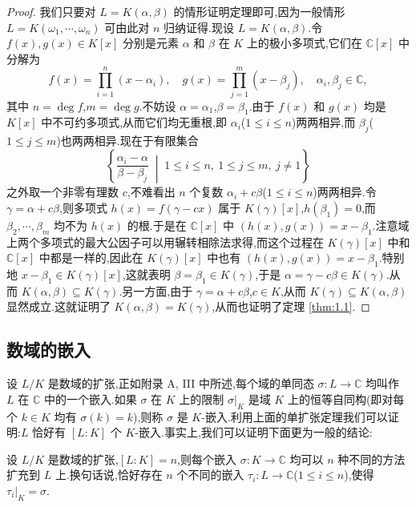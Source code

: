 \begin{proof}
我们只要对 $L=K(\alpha,\beta)$ 的情形证明定理即可,因为一般情形 $L=K(\omega_1,\cdots,\omega_n)$ 可由此对 $n$ 归纳证得.现设 $L=K(\alpha,\beta)$.令 $f(x),g(x)\in K[x]$ 分别是元素 $\alpha$ 和 $\beta$ 在 $K$ 上的极小多项式,它们在 $\mathbb{C}[x]$ 中分解为
\[
  f(x)=\prod_{i=1}^{n}(x-\alpha_i),\quad
  g(x)=\prod_{j=1}^{m}(x-\beta_j),\quad \alpha_i,\beta_j\in\mathbb{C},
\]
其中 $n=\deg f$,$m=\deg g$.不妨设 $\alpha=\alpha_1$,$\beta=\beta_1$.由于 $f(x)$ 和 $g(x)$ 均是 $K[x]$ 中不可约多项式,从而它们均无重根,即 $\alpha_i$($1\leqslant i\leqslant n$)两两相异,而 $\beta_j$($1\leqslant j\leqslant m$)也两两相异.现在于有限集合
\[
  \left\{\frac{\alpha_i-\alpha}{\beta-\beta_j}\;\middle|\;1\leqslant i\leqslant n,\ 1\leqslant j\leqslant m,\ j\neq 1\right\}
\]
之外取一个非零有理数 $c$,不难看出 $n$ 个复数 $\alpha_i+c\beta$($1\leqslant i\leqslant n$)两两相异.令 $\gamma=\alpha+c\beta$,则多项式 $h(x)=f(\gamma-cx)$ 属于 $K(\gamma)[x]$,$h(\beta_1)=0$,而 $\beta_2,\cdots,\beta_m$ 均不为 $h(x)$ 的根.于是在 $\mathbb{C}[x]$ 中 $(h(x),g(x))=x-\beta_1$.注意域上两个多项式的最大公因子可以用辗转相除法求得,而这个过程在 $K(\gamma)[x]$ 中和 $\mathbb{C}[x]$ 中都是一样的,因此在 $K(\gamma)[x]$ 中也有 $(h(x),g(x))=x-\beta_1$.特别地 $x-\beta_1\in K(\gamma)[x]$,这就表明 $\beta=\beta_1\in K(\gamma)$,于是 $\alpha=\gamma-c\beta\in K(\gamma)$.从而 $K(\alpha,\beta)\subseteq K(\gamma)$.另一方面,由于 $\gamma=\alpha+c\beta$,$c\in K$,从而 $K(\gamma)\subseteq K(\alpha,\beta)$ 显然成立.这就证明了 $K(\alpha,\beta)=K(\gamma)$,从而也证明了定理 \ref{thm:1.1}.
\end{proof}

\subsection{数域的嵌入}\label{sec:ch1-s1-2}

设 $L/K$ 是数域的扩张,正如附录 A, III 中所述,每个域的单同态 $\sigma\colon L\to\mathbb{C}$ 均叫作 $L$ 在 $\mathbb{C}$ 中的一个嵌入.如果 $\sigma$ 在 $K$ 上的限制 $\sigma|_K$ 是域 $K$ 上的恒等自同构(即对每个 $k\in K$ 均有 $\sigma(k)=k$),则称 $\sigma$ 是 $K$-嵌入.利用上面的单扩张定理我们可以证明:$L$ 恰好有 $[L:K]$ 个 $K$-嵌入.事实上,我们可以证明下面更为一般的结论:

\begin{theorem}\label{thm:1.2}
设 $L/K$ 是数域的扩张,$[L:K]=n$,则每个嵌入 $\sigma\colon K\to\mathbb{C}$ 均可以 $n$ 种不同的方法扩充到 $L$ 上.换句话说,恰好存在 $n$ 个不同的嵌入 $\tau_i\colon L\to\mathbb{C}$($1\leqslant i\leqslant n$),使得 $\tau_i|_K=\sigma$.
\end{theorem}

